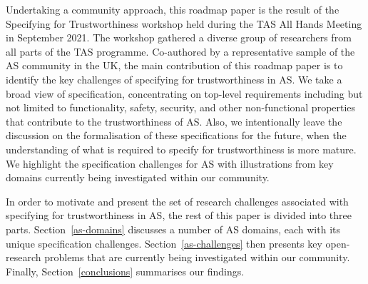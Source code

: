 \documentclass[sigconf,nonacm]{acmart}%
\begin{document}
	Undertaking a community approach, this roadmap paper is the result of the Specifying for Trustworthiness workshop held during the TAS All Hands Meeting in September 2021. The workshop gathered a diverse group of researchers from all parts of the TAS programme. Co-authored by a representative sample of the AS community in the UK, the main contribution of this roadmap paper is to identify the key challenges of specifying for trustworthiness in AS. We take a broad view of specification, concentrating on top-level requirements including but not limited to functionality, safety, security, and other non-functional properties that contribute to the trustworthiness of AS. Also, we intentionally leave the discussion on the formalisation of these specifications for the future, when the understanding of what is required to specify for trustworthiness is more mature. We highlight the specification challenges for AS with illustrations from key domains currently being investigated within our community. 
	
	In order to motivate and present the set of research challenges associated with specifying for trustworthiness in AS, the rest of this paper is divided into three parts. Section~\ref{as-domains} discusses a number of AS domains, each with its unique specification challenges. Section~\ref{as-challenges} then presents key open-research problems that are currently being investigated within our community. Finally, Section~\ref{conclusions} summarises our findings.
	
\end{document}

